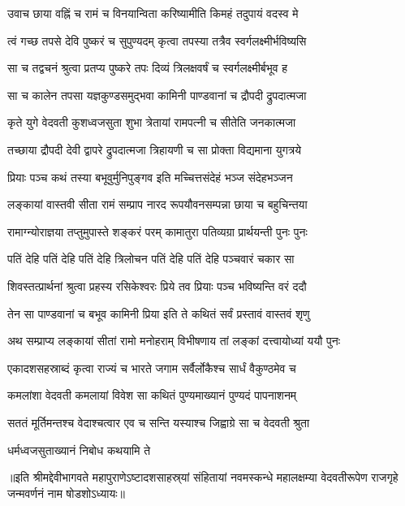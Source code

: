 \twolineshloka
{उवाच छाया वह्निं च रामं च विनयान्विता}
{करिष्यामीति किमहं तदुपायं वदस्व मे} %


\twolineshloka
{त्वं गच्छ तपसे देवि पुष्करं च सुपुण्यदम्}
{कृत्वा तपस्या तत्रैव स्वर्गलक्ष्मीर्भविष्यसि} %

\twolineshloka
{सा च तद्वचनं श्रुत्वा प्रतप्य पुष्करे तपः}
{दिव्यं त्रिलक्षवर्षं च स्वर्गलक्ष्मीर्बभूव ह} %

\twolineshloka
{सा च कालेन तपसा यज्ञकुण्डसमुद्‍भवा}
{कामिनी पाण्डवानां च द्रौपदी द्रुपदात्मजा} %

\twolineshloka
{कृते युगे वेदवती कुशध्वजसुता शुभा}
{त्रेतायां रामपत्‍नी च सीतेति जनकात्मजा} %

\twolineshloka
{तच्छाया द्रौपदी देवी द्वापरे द्रुपदात्मजा}
{त्रिहायणी च सा प्रोक्ता विद्यमाना युगत्रये} %


\twolineshloka
{प्रियाः पञ्च कथं तस्या बभूवुर्मुनिपुङ्‌गव}
{इति मच्चित्तसंदेहं भञ्ज संदेहभञ्जन} %



\twolineshloka
{लङ्‌कायां वास्तवी सीता रामं सम्प्राप नारद}
{रूपयौवनसम्पन्ना छाया च बहुचिन्तया} %

\twolineshloka
{रामाग्न्योराज्ञया तप्तुमुपास्ते शङ्‌करं परम्}
{कामातुरा पतिव्यग्रा प्रार्थयन्ती पुनः पुनः} %

\twolineshloka
{पतिं देहि पतिं देहि पतिं देहि त्रिलोचन}
{पतिं देहि पतिं देहि पञ्चवारं चकार सा} %

\twolineshloka
{शिवस्तत्प्रार्थनां श्रुत्वा प्रहस्य रसिकेश्वरः}
{प्रिये तव प्रियाः पञ्च भविष्यन्ति वरं ददौ} %

\twolineshloka
{तेन सा पाण्डवानां च बभूव कामिनी प्रिया}
{इति ते कथितं सर्वं प्रस्तावं वास्तवं शृणु} %

\twolineshloka
{अथ सम्प्राप्य लङ्‌कायां सीतां रामो मनोहराम्}
{विभीषणाय तां लङ्‌कां दत्त्वायोध्यां ययौ पुनः} %

\twolineshloka
{एकादशसहस्राब्दं कृत्वा राज्यं च भारते}
{जगाम सर्वैर्लोकैश्च सार्धं वैकुण्ठमेव च} %

\twolineshloka
{कमलांशा वेदवती कमलायां विवेश सा}
{कथितं पुण्यमाख्यानं पुण्यदं पापनाशनम्} %

\twolineshloka
{सततं मूर्तिमन्तश्च वेदाश्चत्वार एव च}
{सन्ति यस्याश्च जिह्वाग्रे सा च वेदवती श्रुता} %

\onelineshloka
{धर्मध्वजसुताख्यानं निबोध कथयामि ते}%

॥इति श्रीमद्देवीभागवते महापुराणेऽष्टादशसाहस्र्यां संहितायां नवमस्कन्धे महालक्षम्या वेदवतीरूपेण राजगृहे जन्मवर्णनं नाम षोडशोऽध्यायः॥

\closesection